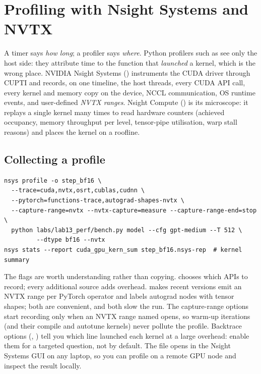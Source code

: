 \section{Profiling with Nsight Systems and NVTX}\label{sec:perf:nsys}

A timer says \emph{how long}; a profiler says \emph{where}. Python profilers such as
 see only the host side: they attribute time to the function that \emph{launched}
a kernel, which is the wrong place. NVIDIA Nsight Systems () instruments the CUDA
driver through CUPTI and records, on one timeline, the host threads, every CUDA API call, every
kernel and memory copy on the device, NCCL communication, OS runtime events, and user-defined
\emph{NVTX ranges}. Nsight Compute () is its microscope: it replays a single kernel many
times to read hardware counters (achieved occupancy, memory throughput per level, tensor-pipe
utilisation, warp stall reasons) and places the kernel on a roofline.

\subsection{Collecting a profile}

\begin{lstlisting}[style=shell,caption={Profiling only the measured iterations.},label={lst:perf:nsys}]
nsys profile -o step_bf16 \
  --trace=cuda,nvtx,osrt,cublas,cudnn \
  --pytorch=functions-trace,autograd-shapes-nvtx \
  --capture-range=nvtx --nvtx-capture=measure --capture-range-end=stop \
  python labs/lab13_perf/bench.py model --cfg gpt-medium --T 512 \
         --dtype bf16 --nvtx
nsys stats --report cuda_gpu_kern_sum step_bf16.nsys-rep  # kernel summary
\end{lstlisting}

The flags are worth understanding rather than copying.  chooses which APIs to
record; every additional source adds overhead.  makes recent
\code{nsys} versions emit an NVTX range per PyTorch operator and  labels
autograd nodes with tensor shapes; both are convenient, and both slow the run. The capture-range
options start recording only when an NVTX range named  opens, so warm-up iterations
(and their compile and autotune kernels) never pollute the profile. Backtrace options
(\code{--cudabacktrace}, \code{--python-backtrace}) tell you which line launched each kernel at a
large overhead: enable them for a targeted question, not by default. The \code{.nsys-rep} file
opens in the Nsight Systems GUI on any laptop, so you can profile on a remote GPU node and inspect
the result locally.

